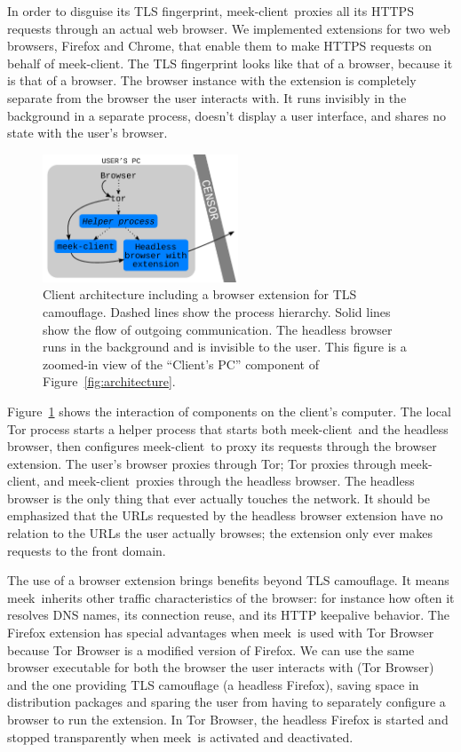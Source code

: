 \documentclass[conference]{IEEEtran}
\def\meekclient{\mbox{meek-client}}
\def\meek{meek}
\begin{document}
In order to disguise its TLS fingerprint,
\meekclient\ proxies all its HTTPS requests through an actual web browser.
We implemented extensions for two web browsers,
Firefox and Chrome,
that enable them to make HTTPS requests on behalf of \meekclient.
The TLS fingerprint looks like that of a browser, because it is that of a browser.
The browser instance with the extension is completely separate
from the browser the user interacts with.
It runs invisibly in the background in a separate process,
doesn't display a user interface,
and shares no state with the user's browser.

\begin{figure}
\centering
\includegraphics[height=1.5in]{browser-architecture}
\caption{
Client architecture including a browser extension for TLS camouflage.
Dashed lines show the process hierarchy.
Solid lines show the flow of outgoing communication.
The headless browser runs in the background and is invisible to the user.
This figure is a zoomed-in view of the ``Client's PC'' component of Figure~\ref{fig:architecture}.
}
\label{fig:browser-architecture}
\end{figure}

Figure~\ref{fig:browser-architecture} shows the interaction of components
on the client's computer.
The local Tor process starts a helper process that starts both \meekclient\
and the headless browser,
then configures \meekclient\ to proxy its requests through the browser extension.
The user's browser proxies through Tor;
Tor proxies through \meekclient,
and \meekclient\ proxies through the headless browser.
The headless browser is the only thing that ever actually touches the network.
It should be emphasized that the URLs requested by the headless browser extension
have no relation to the URLs the user actually browses;
the extension only ever makes requests to the front domain.

The use of a browser extension brings benefits beyond TLS camouflage.
It means \meek\ inherits other traffic characteristics of the browser:
for instance
how often it resolves DNS names,
its connection reuse,
and its HTTP keepalive behavior.
The Firefox extension has special advantages
when \meek\ is used with Tor Browser
because Tor Browser
is a modified version of Firefox.
We can use the same browser executable for both the browser the user interacts with (Tor Browser)
and the one providing TLS camouflage (a headless Firefox),
saving space in distribution packages
and sparing the user from having to separately configure a browser to run the extension.
In Tor Browser,
the headless Firefox is started and stopped transparently
when \meek\ is activated and deactivated.
\end{document}
